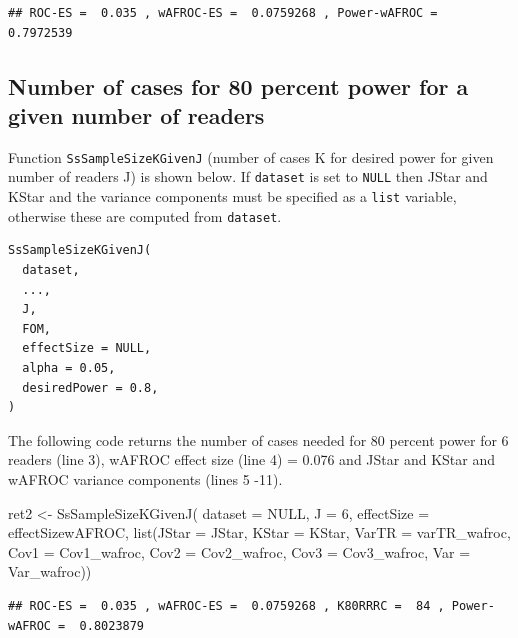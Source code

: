 \documentclass[
]{book}
\newenvironment{Shaded}{\begin{snugshade}}{\end{snugshade}}
\newcommand{\AttributeTok}[1]{\textcolor[rgb]{0.77,0.63,0.00}{#1}}
\newcommand{\ConstantTok}[1]{\textcolor[rgb]{0.00,0.00,0.00}{#1}}
\newcommand{\DecValTok}[1]{\textcolor[rgb]{0.00,0.00,0.81}{#1}}
\newcommand{\FunctionTok}[1]{\textcolor[rgb]{0.00,0.00,0.00}{#1}}
\newcommand{\NormalTok}[1]{#1}
\newcommand{\OtherTok}[1]{\textcolor[rgb]{0.56,0.35,0.01}{#1}}
\begin{document}
\begin{verbatim}
## ROC-ES =  0.035 , wAFROC-ES =  0.0759268 , Power-wAFROC =  0.7972539
\end{verbatim}

\hypertarget{number-of-cases-for-80-percent-power-for-a-given-number-of-readers}{%
\subsection{Number of cases for 80 percent power for a given number of readers}\label{number-of-cases-for-80-percent-power-for-a-given-number-of-readers}}

Function \texttt{SsSampleSizeKGivenJ} (number of cases K for desired power for given number of readers J) is shown below. If \texttt{dataset} is set to \texttt{NULL} then JStar and KStar and the variance components must be specified as a \texttt{list} variable, otherwise these are computed from \texttt{dataset}.

\begin{verbatim}
SsSampleSizeKGivenJ(
  dataset,
  ...,
  J,
  FOM,
  effectSize = NULL,
  alpha = 0.05,
  desiredPower = 0.8,
)
\end{verbatim}

The following code returns the number of cases needed for 80 percent power for 6 readers (line 3), wAFROC effect size (line 4) = 0.076 and JStar and KStar and wAFROC variance components (lines 5 -11).

\begin{Shaded}
\begin{Highlighting}[numbers=left,,]
\NormalTok{ret2 }\OtherTok{\textless{}{-}} \FunctionTok{SsSampleSizeKGivenJ}\NormalTok{(}
  \AttributeTok{dataset =} \ConstantTok{NULL}\NormalTok{, }
  \AttributeTok{J =} \DecValTok{6}\NormalTok{, }
  \AttributeTok{effectSize =}\NormalTok{ effectSizewAFROC, }
  \FunctionTok{list}\NormalTok{(}\AttributeTok{JStar =}\NormalTok{ JStar, }
       \AttributeTok{KStar =}\NormalTok{ KStar, }
       \AttributeTok{VarTR =}\NormalTok{ varTR\_wafroc,}
       \AttributeTok{Cov1 =}\NormalTok{ Cov1\_wafroc,}
       \AttributeTok{Cov2 =}\NormalTok{ Cov2\_wafroc,}
       \AttributeTok{Cov3 =}\NormalTok{ Cov3\_wafroc,}
       \AttributeTok{Var =}\NormalTok{ Var\_wafroc))}
\end{Highlighting}
\end{Shaded}

\begin{verbatim}
## ROC-ES =  0.035 , wAFROC-ES =  0.0759268 , K80RRRC =  84 , Power-wAFROC =  0.8023879
\end{verbatim}
\end{document}
